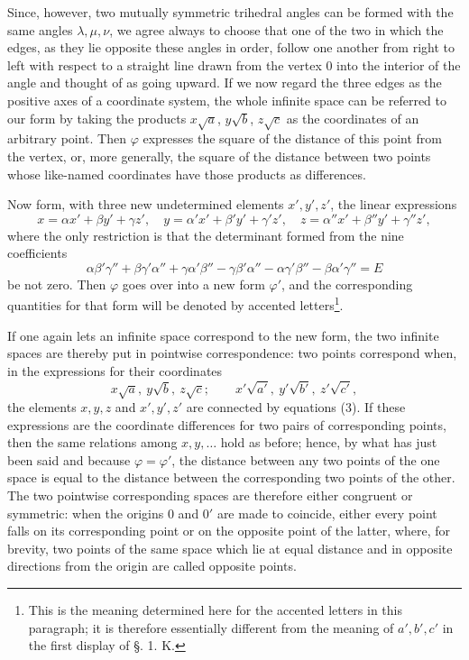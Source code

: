 \documentclass[11pt]{article}
\begin{document}
Since, however, two mutually symmetric trihedral angles can be formed with the same angles $\lambda,\mu,\nu$, we agree always to choose that one of the two in which the edges, as they lie opposite these angles in order, follow one another from right to left with respect to a straight line drawn from the vertex $0$ into the interior of the angle and thought of as going upward. If we now regard the three edges as the positive axes of a coordinate system, the whole infinite space can be referred to our form by taking the products $x\sqrt a$, $y\sqrt b$, $z\sqrt c$ as the coordinates of an arbitrary point. Then $\varphi$ expresses the square of the distance of this point from the vertex, or, more generally, the square of the distance between two points whose like-named coordinates have those products as differences.

Now form, with three new undetermined elements $x',y',z'$, the linear expressions
\begin{equation}
 x=\alpha x'+\beta y'+\gamma z',\quad
 y=\alpha' x'+\beta' y'+\gamma' z',\quad
 z=\alpha'' x'+\beta'' y'+\gamma'' z',
\end{equation}
where the only restriction is that the determinant formed from the nine coefficients
\begin{equation}
 \alpha\beta'\gamma''+\beta\gamma'\alpha''+\gamma\alpha'\beta''-
 \gamma\beta'\alpha''-\alpha\gamma'\beta''-\beta\alpha'\gamma''=E
\end{equation}
be not zero. Then $\varphi$ goes over into a new form $\varphi'$, and the corresponding quantities for that form will be denoted by accented letters\footnote{This is the meaning determined here for the accented letters in this paragraph; it is therefore essentially different from the meaning of $a',b',c'$ in the first display of §. 1. K.}.

If one again lets an infinite space correspond to the new form, the two infinite spaces are thereby put in pointwise correspondence: two points correspond when, in the expressions for their coordinates
\[
 x\sqrt a,\ y\sqrt b,\ z\sqrt c;\qquad x'\sqrt{a'},\ y'\sqrt{b'},\ z'\sqrt{c'},
\]
the elements $x,y,z$ and $x',y',z'$ are connected by equations (3). If these expressions are the coordinate differences for two pairs of corresponding points, then the same relations among $x,y,\ldots$ hold as before; hence, by what has just been said and because $\varphi=\varphi'$, the distance between any two points of the one space is equal to the distance between the corresponding two points of the other. The two pointwise corresponding spaces are therefore either congruent or symmetric: when the origins $0$ and $0'$ are made to coincide, either every point falls on its corresponding point or on the opposite point of the latter, where, for brevity, two points of the same space which lie at equal distance and in opposite directions from the origin are called opposite points.
\end{document}
